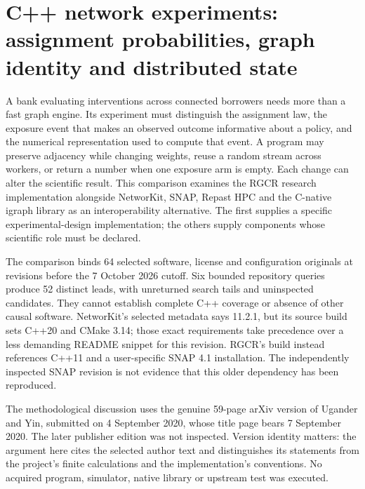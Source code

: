 \section[C++ network experiments]{C++ network experiments: assignment probabilities, graph identity and distributed state}
\label{sec:exec25-cxx-network}

A bank evaluating interventions across connected borrowers needs more than a fast graph engine. Its experiment must distinguish the assignment law, the exposure event that makes an observed outcome informative about a policy, and the numerical representation used to compute that event. A program may preserve adjacency while changing weights, reuse a random stream across workers, or return a number when one exposure arm is empty. Each change can alter the scientific result. This comparison examines the RGCR research implementation alongside NetworKit, SNAP, Repast HPC and the C-native igraph library as an interoperability alternative. The first supplies a specific experimental-design implementation; the others supply components whose scientific role must be declared.~\citep{exec25_cnet_rgcr,exec25_cnet_networkit,exec25_cnet_snap,exec25_cnet_repast,exec25_cnet_igraph}

The comparison binds 64 selected software, license and configuration originals at revisions before the 7 October 2026 cutoff. Six bounded repository queries produce 52 distinct leads, with unreturned search tails and uninspected candidates. They cannot establish complete C++ coverage or absence of other causal software. NetworKit's selected metadata says 11.2.1, but its source build sets C++20 and CMake 3.14; those exact requirements take precedence over a less demanding README snippet for this revision. RGCR's build instead references C++11 and a user-specific SNAP 4.1 installation. The independently inspected SNAP revision is not evidence that this older dependency has been reproduced.~\citep{exec25_cnet_choice,exec25_cnet_networkit,exec25_cnet_rgcr}

The methodological discussion uses the genuine 59-page arXiv version of Ugander and Yin, submitted on 4 September 2020, whose title page bears 7 September 2020. The later publisher edition was not inspected. Version identity matters: the argument here cites the selected author text and distinguishes its statements from the project's finite calculations and the implementation's conventions. No acquired program, simulator, native library or upstream test was executed.~\citep{exec25_cnet_paper,exec25_cnet_choice}

